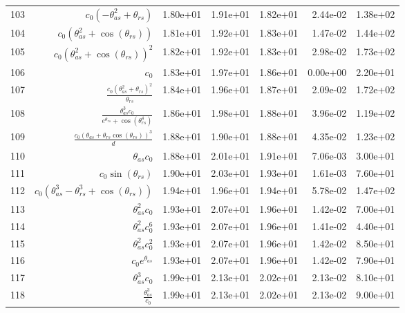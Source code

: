 \begin{tabularx}{\textwidth}{lRRRRRl}
103  &  $ c_{0} \left(- \theta_{as}^{2} + \theta_{rs}\right) $  &  1.80e+01  &  1.91e+01  &  1.82e+01  &  2.44e-02  &  1.38e+02  \\ 
104  &  $ c_{0} \left(\theta_{as}^{2} + \cos{\left(\theta_{rs} \right)}\right) $  &  1.81e+01  &  1.92e+01  &  1.83e+01  &  1.47e-02  &  1.44e+02  \\ 
105  &  $ c_{0} \left(\theta_{as}^{2} + \cos{\left(\theta_{rs} \right)}\right)^{2} $  &  1.82e+01  &  1.92e+01  &  1.83e+01  &  2.98e-02  &  1.73e+02  \\ 
106  &  $ c_{0} $  &  1.83e+01  &  1.97e+01  &  1.86e+01  &  0.00e+00  &  2.20e+01  \\ 
107  &  $ \displaystyle\frac{c_{0} \left(\theta_{as}^{2} + \theta_{rs}\right)^{2}}{\theta_{rs}} $  &  1.84e+01  &  1.96e+01  &  1.87e+01  &  2.09e-02  &  1.72e+02  \\ 
108  &  $ \displaystyle\frac{\theta_{as}^{3} c_{0}}{e^{\theta_{rs}} + \cos{\left(\theta_{rs}^{4} \right)}} $  &  1.86e+01  &  1.98e+01  &  1.88e+01  &  3.96e-02  &  1.19e+02  \\ 
109  &  $ \displaystyle\frac{c_{0} \left(\theta_{as} + \theta_{rs} \cos{\left(\theta_{rs} \right)}\right)^{3}}{d} $  &  1.88e+01  &  1.90e+01  &  1.88e+01  &  4.35e-02  &  1.23e+02  \\ 
110  &  $ \theta_{as} c_{0} $  &  1.88e+01  &  2.01e+01  &  1.91e+01  &  7.06e-03  &  3.00e+01  \\ 
111  &  $ c_{0} \sin{\left(\theta_{rs} \right)} $  &  1.90e+01  &  2.03e+01  &  1.93e+01  &  1.61e-03  &  7.60e+01  \\ 
112  &  $ c_{0} \left(\theta_{as}^{3} - \theta_{rs}^{3} + \cos{\left(\theta_{rs} \right)}\right) $  &  1.94e+01  &  1.96e+01  &  1.94e+01  &  5.78e-02  &  1.47e+02  \\ 
113  &  $ \theta_{as}^{2} c_{0} $  &  1.93e+01  &  2.07e+01  &  1.96e+01  &  1.42e-02  &  7.00e+01  \\ 
114  &  $ \theta_{as}^{2} c_{0}^{6} $  &  1.93e+01  &  2.07e+01  &  1.96e+01  &  1.41e-02  &  4.40e+01  \\ 
115  &  $ \theta_{as}^{2} c_{0}^{2} $  &  1.93e+01  &  2.07e+01  &  1.96e+01  &  1.42e-02  &  8.50e+01  \\ 
116  &  $ c_{0} e^{\theta_{as}} $  &  1.93e+01  &  2.07e+01  &  1.96e+01  &  1.42e-02  &  7.90e+01  \\ 
117  &  $ \theta_{as}^{3} c_{0} $  &  1.99e+01  &  2.13e+01  &  2.02e+01  &  2.13e-02  &  8.10e+01  \\ 
118  &  $ \displaystyle\frac{\theta_{as}^{3}}{c_{0}} $  &  1.99e+01  &  2.13e+01  &  2.02e+01  &  2.13e-02  &  9.00e+01  \\ 

\end{tabularx}
